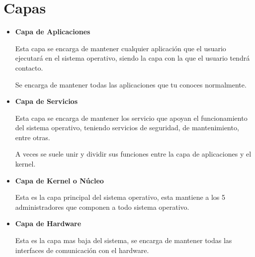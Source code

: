 \documentclass[12pt, fleqn]{report}                             %
\begin{document}
        \clearpage
        \section{Capas}    

            \begin{itemize}
                \item
                    \textbf{Capa de Aplicaciones}

                    Esta capa se encarga de mantener cualquier aplicación que el usuario ejecutará
                    en el sistema operativo, siendo la capa con la que el usuario tendrá contacto.

                    Se encarga de mantener todas las aplicaciones que tu conoces normalmente.


                \item
                    \textbf{Capa de Servicios}

                    Esta capa se encarga de mantener los servicio que apoyan el funcionamiento
                    del sistema operativo, teniendo servicios de seguridad, de mantenimiento,
                    entre otras.

                    A veces se suele unir y dividir sus funciones entre la capa de aplicaciones
                    y el kernel.


                \item
                    \textbf{Capa de Kernel o Núcleo}

                    Esta es la capa principal del sistema operativo, esta mantiene a los 5
                    administradores que componen a todo sistema operativo.


                \item
                    \textbf{Capa de Hardware}

                    Esta es la capa mas baja del sistema, se encarga de mantener todas las interfaces
                    de comunicación con el hardware.

            \end{itemize}


        \clearpage
\end{document}
